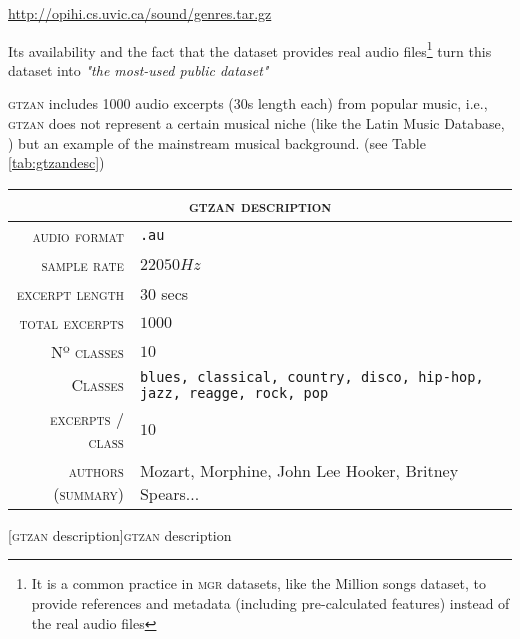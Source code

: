 \begin{center}
\textcolor{gray}{
  \large{
    \url{http://opihi.cs.uvic.ca/sound/genres.tar.gz}
  }
}
\end{center}

Its availability and the fact that the dataset provides real audio files\footnote{It is a common practice in \textsc{\textsc{mgr}} datasets, like the Million songs dataset, to provide references and metadata (including pre-calculated features) instead of the real audio files} turn this dataset into {\it "the most-used public dataset"} \citep{metaGTZAN}

\textsc{gtzan} includes 1000 audio excerpts (30s length each) from popular music, i.e., \textsc{gtzan} does not represent a certain musical niche (like the Latin Music Database, \citet{latin}) but an example of the mainstream musical background. (see Table \ref{tab:gtzandesc})

\begin{center}

  \begin{tabularx}{\textwidth}{r | X}
    \multicolumn{2}{c}{\textsc{\textsc{gtzan} description}} \\
    \hline

    \textsc{audio format} & \texttt{.au} \\
    \textsc{sample rate} & $22050 Hz$ \\
    \textsc{excerpt length} & $30$ secs \\
    \textsc{total excerpts} & $1000$ \\
    \textsc{Nº classes} & $10$ \\
    \textsc{Classes} & \texttt{blues, classical, country, disco, hip-hop, jazz, reagge, rock, pop} \\
    \textsc{excerpts / class} & $10$ \\
    \textsc{authors (summary)} & Mozart, Morphine, John Lee Hooker, Britney Spears... \\
    \hline

  \end{tabularx}


  [\textsc{gtzan} description]{\textsc{gtzan} description \citep{metaGTZAN}}
  \label{tab:gtzandesc}

\end{center}


